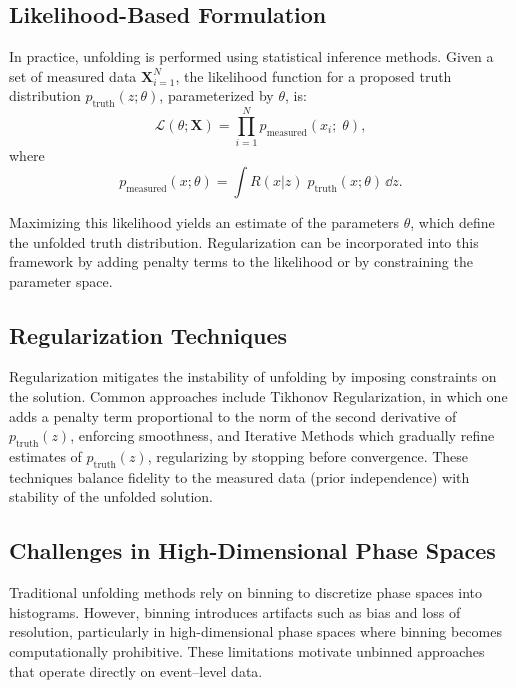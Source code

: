 \subsection{Likelihood-Based Formulation}

In practice, unfolding is performed using statistical inference methods.
%
Given a set of measured data \(\mathbf{X}_{i=1}^N\), the likelihood function for a proposed truth distribution \(p_{\text{truth}}(z; \theta)\), parameterized by \(\theta\), is:
\begin{equation}
    \mathcal{L}(\theta; \mathbf{X}) = \prod_{i=1}^{N} p_{\text{measured}}(x_i;\; \theta),
\end{equation}
where
\begin{equation}
    p_{\text{measured}}(x; \theta) = \int R(x|z) \;p_{\text{truth}}(x; \theta) \, \dd z.
\end{equation}

Maximizing this likelihood yields an estimate of the parameters \(\theta\), which define the unfolded truth distribution.
%
Regularization can be incorporated into this framework by adding penalty terms to the likelihood or by constraining the parameter space.

\subsection{Regularization Techniques}

Regularization mitigates the instability of unfolding by imposing constraints on the solution.
%
Common approaches include Tikhonov Regularization, in which one adds a penalty term proportional to the norm of the second derivative of \(p_{\text{truth}}(z)\), enforcing smoothness, and Iterative Methods which gradually refine estimates of \(p_{\text{truth}}(z)\), regularizing by stopping before convergence.
%
These techniques balance fidelity to the measured data (prior independence) with stability of the unfolded solution.

\subsection{Challenges in High-Dimensional Phase Spaces}

Traditional unfolding methods rely on binning to discretize phase spaces into histograms.
%
However, binning introduces artifacts such as bias and loss of resolution, particularly in high-dimensional phase spaces where binning becomes computationally prohibitive.
%
These limitations motivate unbinned approaches that operate directly on event--level data.

